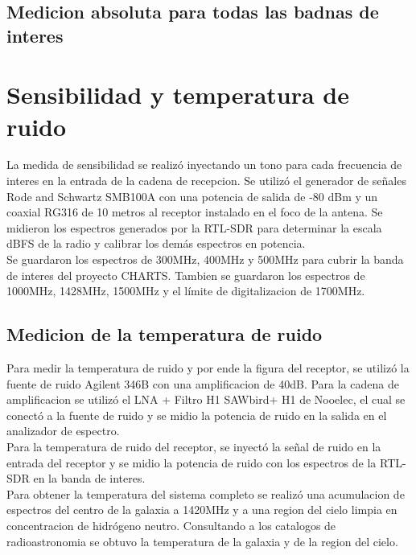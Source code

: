 \subsection{Medicion absoluta para todas las badnas de interes}

\section{Sensibilidad y temperatura de ruido}

La medida de sensibilidad se realizó inyectando un tono para cada frecuencia de interes en la entrada de la cadena de recepcion. Se utilizó el generador de señales Rode and Schwartz SMB100A con una potencia de salida de -80 dBm y un coaxial RG316 de 10 metros al receptor instalado en el foco de la antena. Se midieron los espectros generados por la RTL-SDR para determinar la escala dBFS de la radio y calibrar los demás espectros en potencia.\\

Se guardaron los espectros de 300MHz, 400MHz y 500MHz para cubrir la banda de interes del proyecto CHARTS. Tambien se guardaron los espectros de 1000MHz, 1428MHz, 1500MHz y el límite de digitalizacion de 1700MHz.\\

\subsection{Medicion de la temperatura de ruido}

Para medir la temperatura de ruido y por ende la figura del receptor, se utilizó la fuente de ruido Agilent 346B con una amplificacion de 40dB. Para la cadena de amplificacion se utilizó el LNA + Filtro H1 SAWbird+ H1 de Nooelec, el cual se conectó a la fuente de ruido y se midio la potencia de ruido en la salida en el analizador de espectro.\\

Para la temperatura de ruido del receptor, se inyectó la señal de ruido en la entrada del receptor y se midio la potencia de ruido con los espectros de la RTL-SDR en la banda de interes.\\

Para obtener la temperatura del sistema completo se realizó una acumulacion de espectros del centro de la galaxia a 1420MHz y a una region del cielo limpia en concentracion de hidrógeno neutro. Consultando a los catalogos de radioastronomia se obtuvo la temperatura de la galaxia y de la region del cielo.\\

